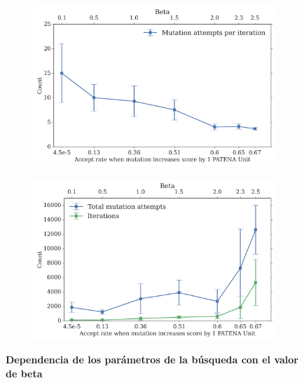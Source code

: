 \begin{figure}[htbp]
  \begin{subfigure}[b]{0.9\textwidth}
    \includegraphics[width=\textwidth]{img/resultados/beta-vs-Mut-iterationsPerIt.png}
    \caption{}
    \label{fig:betaVsMut-AttemptsPerit}
  \end{subfigure}
  \begin{subfigure}[b]{0.9\textwidth}
      \includegraphics[width=\textwidth]{img/resultados/beta-vs-Mut-iterations.png}
    \caption{}
  \label{fig:betaVsMutations-Attempts}
  \end{subfigure}
  \caption{\textbf{Dependencia de los parámetros de la búsqueda con el valor de beta}}
  \label{fig:betaVsAll}
\end{figure}











